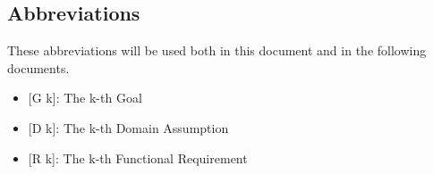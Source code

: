 \subsection{Abbreviations}
These abbreviations will be used both in this document and in the following documents.
\begin{itemize}
	\item {[}G k{]}: The k-th Goal
    \item {[}D k{]}: The k-th Domain Assumption
    \item {[}R k{]}: The k-th Functional Requirement
\end{itemize}
